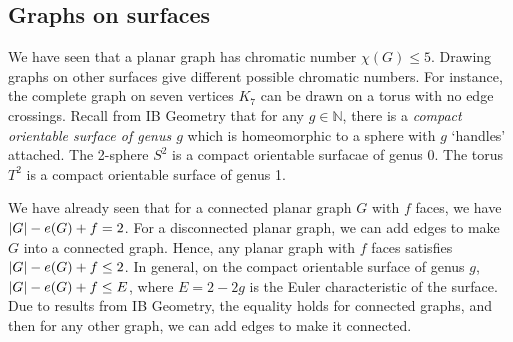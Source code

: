 \subsection{Graphs on surfaces}
We have seen that a planar graph has chromatic number \( \chi(G) \leq 5 \).
Drawing graphs on other surfaces give different possible chromatic numbers.
For instance, the complete graph on seven vertices \( K_7 \) can be drawn on a torus with no edge crossings.
Recall from IB Geometry that for any \( g \in \mathbb N \), there is a \emph{compact orientable surface of genus \( g \)} which is homeomorphic to a sphere with \( g \) `handles' attached.
The 2-sphere \( S^2 \) is a compact orientable surfacae of genus 0.
The torus \( T^2 \) is a compact orientable surface of genus 1.

We have already seen that for a connected planar graph \( G \) with \( f \) faces, we have \( \abs{G} - e(G) + f = 2 \).
For a disconnected planar graph, we can add edges to make \( G \) into a connected graph.
Hence, any planar graph with \( f \) faces satisfies \( \abs{G} - e(G) + f \leq 2 \).
In general, on the compact orientable surface of genus \( g \), \( \abs{G} - e(G) + f \leq E \), where \( E = 2 - 2g \) is the Euler characteristic of the surface.
Due to results from IB Geometry, the equality holds for connected graphs, and then for any other graph, we can add edges to make it connected.

